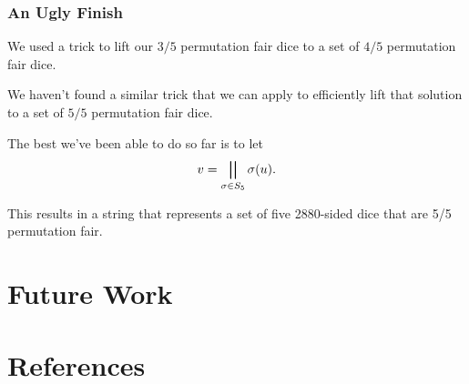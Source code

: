 \documentclass[aspectratio=169]{beamer}
\begin{document}
\begin{frame}[triangle=siiblue]
\frametitle{An Ugly Finish}
We used a trick to lift our $3/5$ permutation fair dice to a set of $4/5$ permutation fair dice.

\vfill

We haven't found a similar trick that we can apply to efficiently lift that solution to a set of $5/5$ permutation fair dice.

\vfill

The best we've been able to do so far is to let
\begin{equation*}
v = \bigparallel_{\sigma \in S_5} \sigma(u).
\end{equation*}

\vfill

This results in a string that represents a set of five 2880-sided dice that are 5/5 permutation fair.

\end{frame}

\section{Future Work}
\begin{frame}[Triangle=siiorange]
	\tocpage
\end{frame}


\section{References}
\begin{frame}[Triangle=siiorange]
	\tocpage
\end{frame}
\end{document}
